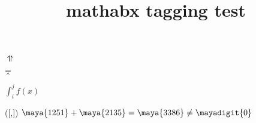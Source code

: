 \documentclass{article}
\title{mathabx tagging test}
\begin{document}
$\upupharpoons$

$\doublebarwedge$

$\int_i^j f(x)$

\mayadelimiters([,])
$\maya{1251}+\maya{2135}=\maya{3386}\neq\mayadigit{0}$
\end{document}

